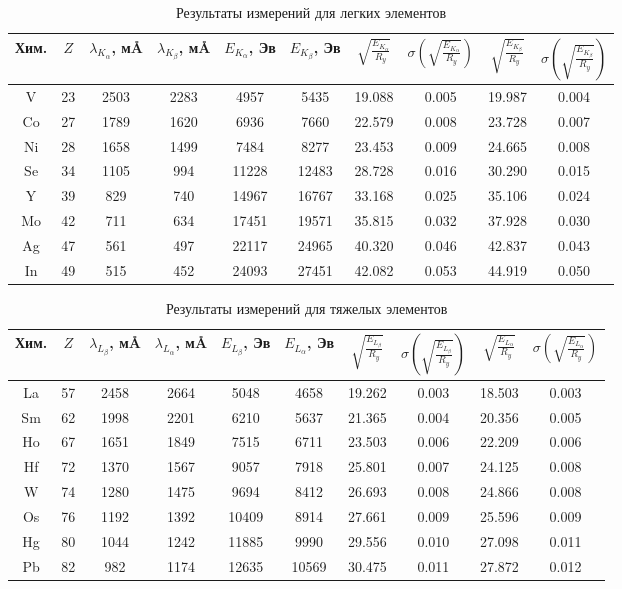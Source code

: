 \documentclass[a4paper, 12pt]{article}%
\begin{document}
		\begin{table}[!ht]
    			\centering
			\begin{tabular}{|c|c|c|c|c|c|c|c|c|c|}
				\hline
				Хим. & $Z$ & $\lambda_{K_{\alpha}}$,  м\AA & $\lambda_{K_{\beta}}$,  м\AA & $E_{K_{\alpha}}$,  Эв & $E_{K_{\beta}}$,  Эв & $\sqrt{\frac{E_{K_{\alpha}}}{R_y}}$ & $\sigma\left(\sqrt{\frac{E_{K_{\alpha}}}{R_y}}\right)$ & $\sqrt{\frac{E_{K_{\beta}}}{R_y}}$ & $\sigma\left(\sqrt{\frac{E_{K_{\beta}}}{R_y}}\right)$  \\
				\hline
				V & 23 & 2503 & 2283 & 4957 & 5435 & 19.088 & 0.005 & 19.987 & 0.004 \\ 
				Co & 27 & 1789 & 1620 & 6936 & 7660 & 22.579 & 0.008 & 23.728 & 0.007 \\ 
				Ni & 28 & 1658 & 1499 & 7484 & 8277 & 23.453 & 0.009 & 24.665 & 0.008 \\ 
				Se & 34 & 1105 & 994 & 11228 & 12483 & 28.728 & 0.016 & 30.290 & 0.015 \\ 
				Y & 39 & 829 & 740 & 14967 & 16767 & 33.168 & 0.025 & 35.106 & 0.024 \\ 
				Mo & 42 & 711 & 634 & 17451 & 19571 & 35.815 & 0.032 & 37.928 & 0.030 \\ 
				Ag & 47 & 561 & 497 & 22117 & 24965 & 40.320 & 0.046 & 42.837 & 0.043 \\ 
				In & 49 & 515 & 452 & 24093 & 27451 & 42.082 & 0.053 & 44.919 & 0.050 \\
				\hline
			\end{tabular}
			\caption{Результаты измерений для легких элементов}
		\end{table}

		\begin{table}[!ht]
			\centering
			\begin{tabular}{|c|c|c|c|c|c|c|c|c|c|}
				\hline
				Хим. & $Z$ & $\lambda_{L_{\beta}}$,  м\AA & $\lambda_{L_{\alpha}}$,  м\AA & $E_{L_{\beta}}$,  Эв & $E_{L_{\alpha}}$,  Эв & $\sqrt{\frac{E_{L_{\beta}}}{R_y}}$ & $\sigma\left(\sqrt{\frac{E_{L_{\beta}}}{R_y}}\right)$ & $\sqrt{\frac{E_{L_{\alpha}}}{R_y}}$ & $\sigma\left(\sqrt{\frac{E_{L_{\alpha}}}{R_y}}\right)$  \\
				\hline
				La & 57 & 2458 & 2664 & 5048 & 4658 & 19.262 & 0.003 & 18.503 & 0.003 \\ 
				Sm & 62 & 1998 & 2201 & 6210 & 5637 & 21.365 & 0.004 & 20.356 & 0.005 \\ 
				Ho & 67 & 1651 & 1849 & 7515 & 6711 & 23.503 & 0.006 & 22.209 & 0.006 \\ 
				Hf & 72 & 1370 & 1567 & 9057 & 7918 & 25.801 & 0.007 & 24.125 & 0.008 \\ 
				W & 74 & 1280 & 1475 & 9694 & 8412 & 26.693 & 0.008 & 24.866 & 0.008 \\ 
				Os & 76 & 1192 & 1392 & 10409 & 8914 & 27.661 & 0.009 & 25.596 & 0.009 \\ 
				Hg & 80 & 1044 & 1242 & 11885 & 9990 & 29.556 & 0.010 & 27.098 & 0.011 \\ 
				Pb & 82 & 982 & 1174 & 12635 & 10569 & 30.475 & 0.011 & 27.872 & 0.012 \\ \hline
			\end{tabular}
			\caption{Результаты измерений для тяжелых элементов}
		\end{table}
\end{document}
